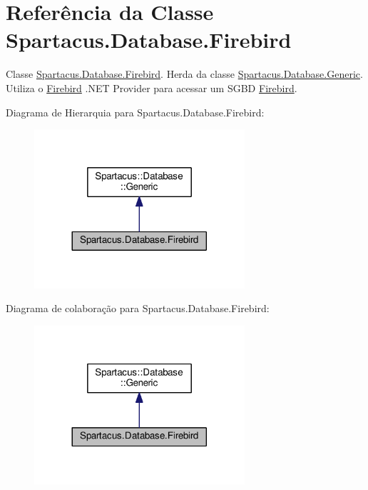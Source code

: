 \hypertarget{classSpartacus_1_1Database_1_1Firebird}{\section{Referência da Classe Spartacus.\+Database.\+Firebird}
\label{classSpartacus_1_1Database_1_1Firebird}
}


Classe \hyperlink{classSpartacus_1_1Database_1_1Firebird}{Spartacus.\+Database.\+Firebird}. Herda da classe \hyperlink{classSpartacus_1_1Database_1_1Generic}{Spartacus.\+Database.\+Generic}. Utiliza o \hyperlink{classSpartacus_1_1Database_1_1Firebird}{Firebird} .N\+E\+T Provider para acessar um S\+G\+B\+D \hyperlink{classSpartacus_1_1Database_1_1Firebird}{Firebird}.  




Diagrama de Hierarquia para Spartacus.\+Database.\+Firebird\+:\nopagebreak
\begin{figure}[H]
\begin{center}
\leavevmode
\includegraphics[width=221pt]{classSpartacus_1_1Database_1_1Firebird__inherit__graph}
\end{center}
\end{figure}


Diagrama de colaboração para Spartacus.\+Database.\+Firebird\+:\nopagebreak
\begin{figure}[H]
\begin{center}
\leavevmode
\includegraphics[width=221pt]{classSpartacus_1_1Database_1_1Firebird__coll__graph}
\end{center}
\end{figure}
